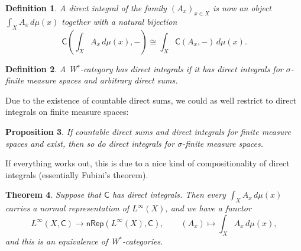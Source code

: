 \documentclass[reqno,T1]{amsproc}
\newcommand{\cat}[1]{\mathsf{#1}}		%
\newcommand{\NRep}[1]{\mathsf{nRep}(#1)}	%
\theoremstyle{plain}
\newtheorem{thm}{Theorem}[section]
\newtheorem{prop}[thm]{Proposition}
\newtheorem{defn}[thm]{Definition}
\theoremstyle{remark}
\numberwithin{equation}{section}
\begin{document}
\begin{defn}
A \emph{direct integral} of the family $(A_x)_{x\in X}$ is now an object $\int_X A_x \, d\mu(x)$ together with a natural bijection
\[
	\cat{C}\left( \int_X A_x \, d\mu(x), -\right) \cong \int_X \cat{C}(A_x,-) \, d\mu(x).
\]
\end{defn}


\begin{defn}
A W$^*$-category \emph{has direct integrals} if it has direct integrals for $\sigma$-finite measure spaces and arbitrary direct sums.
\end{defn}


Due to the existence of countable direct sums, we could as well restrict to direct integrals on finite measure spaces:

\begin{prop}
If countable direct sums and direct integrals for finite measure spaces and exist, then so do direct integrals for $\sigma$-finite measure spaces.
\end{prop}

If everything works out, this is due to a nice kind of compositionality of direct integrals (essentially Fubini's theorem).


\begin{thm}
Suppose that $\cat{C}$ has direct integrals. Then every $\int_X A_x \, d\mu(x)$ carries a normal representation of $L^\infty(X)$, and we have a functor
\[
	L^\infty(X,\cat{C}) \to \NRep{L^\infty(X),\cat{C}} , \qquad (A_x) \mapsto \int_X A_x \, d\mu(x),
\]
and this is an equivalence of W$^*$-categories.
\end{thm}




\end{document}
